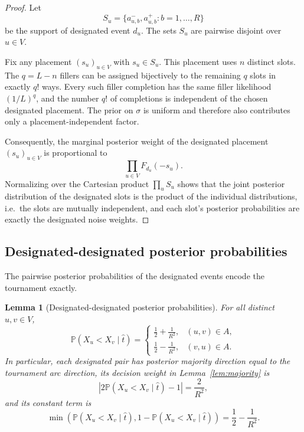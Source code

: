 \documentclass[11pt]{article}
\newtheorem{lemma}{Lemma}
\newcommand{\Prb}{\mathbb{P}}
\begin{document}
\begin{proof}
Let
\begin{equation}
  S_u=\{a_{u,b}^-,a_{u,b}^+: b=1,
\ldots,R\}
\end{equation}
be the support of designated event $d_u$.  The sets $S_u$ are pairwise disjoint over $u\in V$.

Fix any placement $(s_u)_{u\in V}$ with $s_u\in S_u$.  This placement uses $n$ distinct slots.  The $q=L-n$ fillers can be assigned bijectively to the remaining $q$ slots in exactly $q!$ ways.  Every such filler completion has the same filler likelihood $(1/L)^q$, and the number $q!$ of completions is independent of the chosen designated placement.  The prior on $\sigma$ is uniform and therefore also contributes only a placement-independent factor.

Consequently, the marginal posterior weight of the designated placement $(s_u)_{u\in V}$ is proportional to
\begin{equation}
  \prod_{u\in V} F_{d_u}(-s_u).
\end{equation}
Normalizing over the Cartesian product $\prod_u S_u$ shows that the joint posterior distribution of the designated slots is the product of the individual distributions, i.e.\ the slots are mutually independent, and each slot's posterior probabilities are exactly the designated noise weights.
\end{proof}

\subsection{Designated-designated posterior probabilities}

The pairwise posterior probabilities of the designated events encode the tournament exactly.

\begin{lemma}[Designated-designated posterior probabilities]\label{lem:designated}
For all distinct $u,v\in V$,
\begin{equation}
  \Prb(X_u<X_v\mid \hat t)
  =
  \begin{cases}
    \displaystyle \frac12+\frac1{R^2}, & (u,v)\in A,\\[6pt]
    \displaystyle \frac12-\frac1{R^2}, & (v,u)\in A.
  \end{cases}
\end{equation}
In particular, each designated pair has posterior majority direction equal to the tournament arc direction, its decision weight in Lemma~\ref{lem:majority} is
\begin{equation}
  \left|2\Prb(X_u<X_v\mid \hat t)-1\right|=\frac2{R^2},
\end{equation}
and its constant term is
\begin{equation}
  \min\left(\Prb(X_u<X_v\mid \hat t),1-\Prb(X_u<X_v\mid \hat t)\right)
  =\frac12-\frac1{R^2}.
\end{equation}
\end{lemma}
\end{document}
